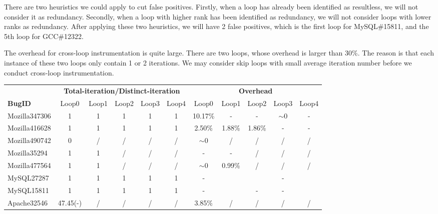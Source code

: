 There are two heuristics we could apply to cut false positives. Firstly, when a loop has already been identified as resultless, 
we will not consider it as redundancy. Secondly, when a loop with higher rank has been identified as redundancy, 
we will not consider loops with lower ranks as redundancy. 
After applying these two heuristics, we will have 2 false positives, which is the first loop for MySQL\#15811, and the 5th loop for GCC\#12322.

The overhead for cross-loop instrumentation is quite large. There are two loops, whose overhead is larger than 30\%.
 The reason is that each instance of these two loops only contain 1 or 2 iterations. 
 We may consider skip loops with small average iteration number before we conduct cross-loop instrumentation.  

\begin{table*}
  \centering
  \scriptsize
  \newcommand{\Yes}[1]{\checkmark{}$_#1$}
  \newcommand{\No}[0]{-}
  \begin{tabular}{lcccccccccc}
    \toprule
              &  \multicolumn{5}{c}{\bf Total-iteration/Distinct-iteration} & \multicolumn{5}{c}{\bf Overhead} \\
\cmidrule(lr){2-6} \cmidrule(lr){7-11} 
   {\bf BugID}      & Loop0 & Loop1 &  Loop2 &   Loop3 &   Loop4 & Loop0     &   Loop1 &   Loop2 &  Loop3 &   Loop4   \\
    \midrule
    Mozilla347306   &   1   &  1    &   1    &   1     &    1    &   10.17\% & -        & -      & $\sim$0& -    \\
    Mozilla416628   &   1   &  1    &   1    &   1     &    1    &   2.50\%  & 1.88\%   & 1.86\% & -        &  -     \\
    Mozilla490742   &   0   &  /    &   /    &   /     &    /    &   $\sim$0 & /        & /      &  /     &  /      \\
    Mozilla35294    &   1   &  1    & /      & /       &   /     &   -       & -        & /      &  /     &  /      \\
    Mozilla477564   &   1   &  1    & /      & /       &   /     &   $\sim$0 & 0.99\%   & /      &  /     &  /    \\
    \midrule
    MySQL27287      &   1   &  1    &  1     &   1     &   1     &    -      &          &        &  -      &        \\
    MySQL15811      &   1   &  1    &  1     &   1     &   1     &    -      &          &   -    &  -      &         \\
    \midrule
    Apache32546     &  47.45(\No) & /     & /      & /       &   /    & 3.85\%  & /        & /           &  /       &  /       \\

\end{tabular}
\end{table*}
